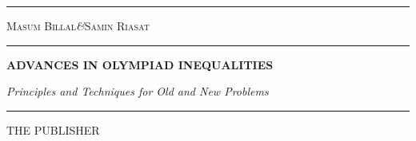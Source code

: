 \documentclass[a4paper, 14pt, leqno,fleq]{extbook}
\theoremstyle{definition}
\numberwithin{problem}{chapter}
\begin{document}
	\frontmatter
	\begin{titlepage}
		\txtheight
		\begin{minipage}[t]{0.05\txtwidth}
			\color{darkjunglegreen}
			\rule{6pt}{\txtheight}
		\end{minipage}
		\hspace{0.05\txtwidth}
		\begin{minipage}[t]{2\txtwidth}
			\color{darkjunglegreen}
			\vspace*{\drop}
			{\Large\scshape Masum Billal\quad\textit{\&}\quad Samin Riasat} \\
			\rule{1\txtwidth}{1pt} \par
			\vspace{3\baselineskip}
			{\noindent\bfseries ADVANCES IN OLYMPIAD INEQUALITIES} \par
			\vspace{2\baselineskip}
			{\large\itshape Principles and Techniques for Old and New Problems} \par
			\vspace{6.5\baselineskip}
			{\scshape } \par
			\vspace{0.1\baselineskip}
			{\Large } \par
			\vspace{\baselineskip}
			\rule{\txtwidth}{1pt} \par
			\vspace{\baselineskip}
			{\Large THE PUBLISHER}
		\end{minipage}
		\hfill
	\end{titlepage}
		
\end{document}

